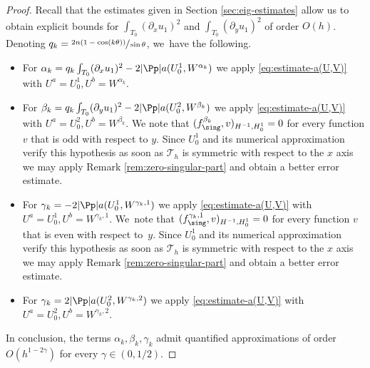 \skpt
\begin{proof}
Recall that the estimates given in Section \ref{sec:eig-estimates} allow us to obtain explicit bounds for $\int_{T_0}(\partial_x u_1)^2$ and $\int_{T_0} (\partial_y u_1)^2$ of order $O(h)$. Denoting \hbox{$q_k = \sfrac{2n(1-\cos(k\theta))}{\sin \theta}$}, we~have the following.
\begin{itemize}
\item For $\alpha_k = q_k\int_{T_0}(\partial_x u_1)^2-2|\Pp| a(U_0^1,W^{\alpha_k})$ we apply \eqref{eq:estimate-a(U,V)} with $U^a = U_0^1,U^b = W^{\alpha_k}$.
\item For $\beta_k = q_k\int_{T_0}(\partial_y u_1)^2-2|\Pp| a(U_0^2,W^{\beta_k})$ we apply \eqref{eq:estimate-a(U,V)} with $U^a = U_0^2,U^b = W^{\beta_k}$. We note that $(f_{\sing}^{\beta_k},v)_{H^{-1},H_0^1} = 0$ for every function $v$ that is odd with respect to $y$. Since $U_0^1$ and its numerical approximation verify this hypothesis as soon as $\mathcal T_h$ is symmetric with respect to the $x$ axis we may apply Remark \ref{rem:zero-singular-part} and obtain a better error estimate.
\item For $\gamma_k = -2|\Pp|a(U_0^1,W^{\gamma_k,1})$ we apply \eqref{eq:estimate-a(U,V)} with $U^a = U_0^1, U^b = W^{\gamma_k,1}$. We~note that $(f_{\sing}^{\gamma_k,1},v)_{H^{-1},H_0^1} = 0$ for every function $v$ that is even with respect to~$y$. Since $U_0^1$ and its numerical approximation verify this hypothesis as soon as $\mathcal T_h$ is symmetric with respect to the $x$ axis we may apply Remark \ref{rem:zero-singular-part} and obtain a better error estimate.
\item For $\gamma_k = 2|\Pp| a(U_0^2,W^{\gamma_k,2})$ we apply \eqref{eq:estimate-a(U,V)} with $U^a = U_0^2, U^b = W^{\gamma_k,2}$.
\end{itemize}
In conclusion, the terms $\alpha_k,\beta_k,\gamma_k$ admit quantified approximations of order $O(h^{1-2\gamma})$ for every $\gamma \in (0,1/2)$.
\end{proof}

